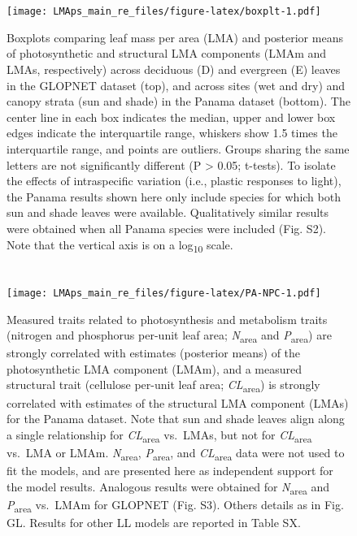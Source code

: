 \documentclass[
  12pt,
]{article}
\begin{document}
\newpage

\hypertarget{section-6}{%
\section{}\label{section-6}}

\begin{figure}
\centering
\texttt{[image: LMAps\_main\_re\_files/figure-latex/boxplt-1.pdf]}
\caption{\label{fig:boxplt}Boxplots comparing leaf mass per area (LMA) and posterior means of photosynthetic and structural LMA components (LMAm and LMAs, respectively) across deciduous (D) and evergreen (E) leaves in the GLOPNET dataset (top), and across sites (wet and dry) and canopy strata (sun and shade) in the Panama dataset (bottom). The center line in each box indicates the median, upper and lower box edges indicate the interquartile range, whiskers show 1.5 times the interquartile range, and points are outliers. Groups sharing the same letters are not significantly different (P \textgreater{} 0.05; t-tests). To isolate the effects of intraspecific variation (i.e., plastic responses to light), the Panama results shown here only include species for which both sun and shade leaves were available. Qualitatively similar results were obtained when all Panama species were included (Fig. S2). Note that the vertical axis is on a log\textsubscript{10} scale.}
\end{figure}

\newpage

\hypertarget{section-7}{%
\section{}\label{section-7}}

\begin{figure}
\centering
\texttt{[image: LMAps\_main\_re\_files/figure-latex/PA-NPC-1.pdf]}
\caption{\label{fig:PA-NPC}Measured traits related to photosynthesis and metabolism traits (nitrogen and phosphorus per-unit leaf area; \emph{N}\textsubscript{area} and \emph{P}\textsubscript{area}) are strongly correlated with estimates (posterior means) of the photosynthetic LMA component (LMAm), and a measured structural trait (cellulose per-unit leaf area; \emph{CL}\textsubscript{area}) is strongly correlated with estimates of the structural LMA component (LMAs) for the Panama dataset. Note that sun and shade leaves align along a single relationship for \emph{CL}\textsubscript{area} vs.~LMAs, but not for \emph{CL}\textsubscript{area} vs.~LMA or LMAm. \emph{N}\textsubscript{area}, \emph{P}\textsubscript{area}, and \emph{CL}\textsubscript{area} data were not used to fit the models, and are presented here as independent support for the model results. Analogous results were obtained for \emph{N}\textsubscript{area} and \emph{P}\textsubscript{area} vs.~LMAm for GLOPNET (Fig. S3). Others details as in Fig. GL. Results for other LL models are reported in Table SX.}
\end{figure}
\end{document}
